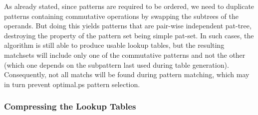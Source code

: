 {As already stated, since \glspl{pattern} are required to be ordered, we need to
duplicate \glspl{pattern} containing commutative operations by swapping the
\glspl{subtree} of the operands.
%
But doing this yields \glspl{pattern} that are
pair-wise \gls{independent pat-tree}, destroying the property of the
\gls{pattern set} being \gls{simple pat-set}.
%
In such cases, the algorithm is
still able to produce usable lookup tables, but the resulting matchsets will
include only one of the commutative \glspl{pattern} and not the other (which one
depends on the \gls{subpattern} last used during table
generation).
%
Consequently, not all \glspl{match} will be found during
\gls{pattern matching}, which may in turn prevent \gls{optimal.ps}
\gls{pattern selection}.


\subsubsection{Compressing the Lookup Tables}

}
